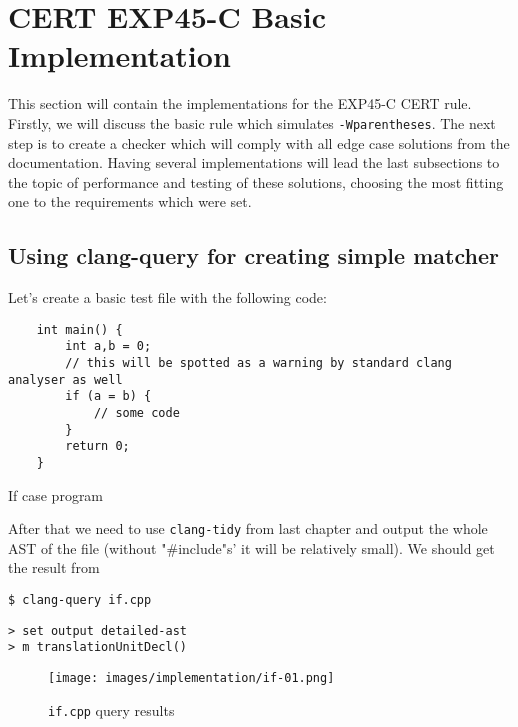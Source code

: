 \section{CERT EXP45-C Basic Implementation}

This section will contain the implementations for the EXP45-C CERT rule. Firstly, we will discuss the basic rule which simulates \lstinline|-Wparentheses|. The next step is to create a checker which will comply with all edge case solutions from the documentation. Having several implementations will lead the last subsections to the topic of performance and testing of these solutions, choosing the most fitting one to the requirements which were set.

\subsection{Using clang-query for creating simple matcher}

Let's create a basic test file with the following code:

\begin{listing}[H]
\begin{verbatim}
    int main() {
        int a,b = 0;
        // this will be spotted as a warning by standard clang analyser as well
        if (a = b) {
            // some code
        }
        return 0;
    }
\end{verbatim}
\caption{If case program}
\end{listing}

After that we need to use \lstinline|clang-tidy| from last chapter and output the whole AST of the file (without  "\#include"s' it will be relatively small). We should get the result from 

\begin{listing}[H]
\begin{verbatim}
$ clang-query if.cpp
\end{verbatim}
\caption{Run clang-query with \lstinline{if.cpp}}
\end{listing}

\begin{listing}[H]
\begin{verbatim}
> set output detailed-ast
> m translationUnitDecl()
\end{verbatim}
\caption{Show \lstinline{if.cpp} AST}
\end{listing}

\begin{figure}[H]
	\centering
	\caption{\lstinline|if.cpp| query results}
	\texttt{[image: images/implementation/if-01.png]}
	\label{fig:if-case-query}
\end{figure}

